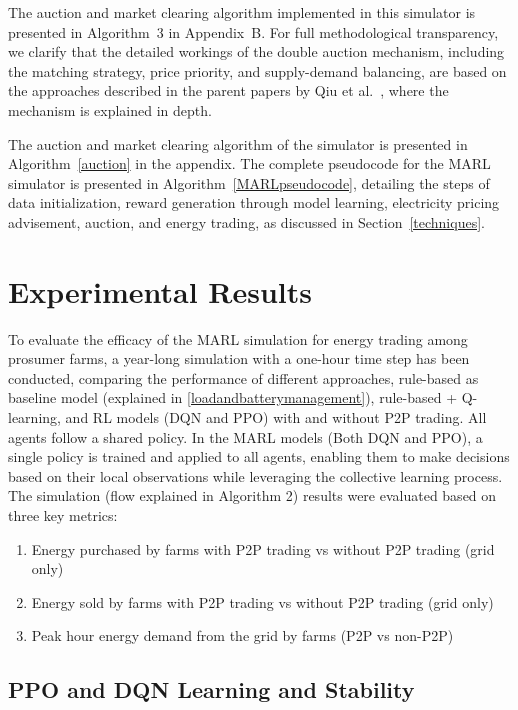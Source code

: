 \documentclass[preprint,12pt]{elsarticle}
\begin{document}
The auction and market clearing algorithm implemented in this simulator is presented in Algorithm~3 in Appendix~B. For full methodological transparency, we clarify that the detailed workings of the double auction mechanism, including the matching strategy, price priority, and supply-demand balancing, are based on the approaches described in the parent papers by Qiu et al.~\cite{qiu2022mean, qiu2021multi}, where the mechanism is explained in depth.

The auction and market clearing algorithm of the simulator is presented in Algorithm~\ref{auction} in the appendix. The complete pseudocode for the MARL simulator is presented in Algorithm~\ref{MARLpseudocode}, detailing the steps of data initialization, reward generation through model learning, electricity pricing advisement, auction, and energy trading, as discussed in Section~\ref{techniques}.



\section{Experimental Results}
\label{results}


To evaluate the efficacy of the MARL simulation for energy trading among prosumer farms, a year-long simulation with a one-hour time step has been conducted, comparing the performance of different approaches, rule-based as baseline model (explained in \ref{loadandbatterymanagement}), rule-based + Q-learning, and RL models (DQN and PPO) with and without P2P trading. All agents follow a shared policy. In the MARL models (Both DQN and PPO), a single policy is trained and applied to all agents, enabling them to make decisions based on their local observations while leveraging the collective learning process. The simulation (flow explained in Algorithm 2) results were evaluated based on three key metrics:

\begin{enumerate}
\item[$(i)$] Energy purchased by farms with P2P trading vs without P2P trading (grid only)
\item[$(ii)$] Energy sold by farms with P2P trading vs without P2P trading (grid only)
\item[$(iii)$] Peak hour energy demand from the grid by farms (P2P vs non-P2P)
\end{enumerate}


\subsection{PPO and DQN Learning and Stability}
\end{document}

